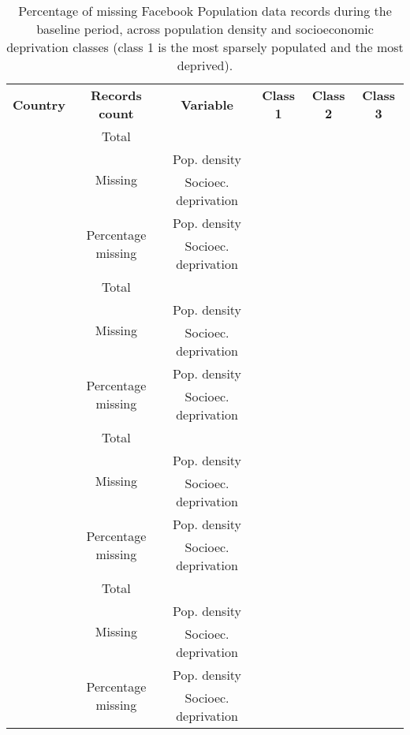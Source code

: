 \documentclass[
  11pt,
]{article}
\begin{document}
\begin{table}[ht]
 \centering 
 \captionsetup{width=\textwidth}
 \caption{Percentage of missing Facebook Population data records during the baseline period, across population density and socioeconomic deprivation classes (class 1 is the most sparsely populated and the most deprived).} 
 
\begin{tabular}{cccccc}
  \multirow{2}{*}{\textbf{Country}} & \multirow{2}{*}{\textbf{Records count}} & \multirow{2}{*}{\textbf{Variable}} & \multirow{2}{*}{\textbf{Class 1}} & \multirow{2}{*}{\textbf{Class 2}} & \multirow{2}{*}{\textbf{Class 3}}\\
  & & & & \\
  \Xhline{1.5pt}
   
  \multirow{5}{*}{ \;\; Argentina \;\; } & \;\;Total\;\; & & & & \\ 
  \cline{2-6}
  & \multirow{2}{*}{Missing} & \;\;Pop. density\;\; & & & \\
  & & \;\;Socioec. deprivation\;\; & & & \\
  \cline{2-6}
  & \multirow{2}{*}{Percentage missing} &  \;\;Pop. density\;\; & & & \\
  & & \;\;Socioec. deprivation\;\; & & & \\
  \Xhline{1.5pt}
  
  \multirow{5}{*}{ \;\; Chile \;\; } & \;\;Total\;\; & & & & \\ 
  \cline{2-6}
  & \multirow{2}{*}{Missing} & \;\;Pop. density\;\; & & & \\
  & & \;\;Socioec. deprivation\;\; & & & \\
  \cline{2-6}
  & \multirow{2}{*}{Percentage missing} &  \;\;Pop. density\;\; & & & \\
  & & \;\;Socioec. deprivation\;\; & & & \\
  \Xhline{1.5pt}
  
  \multirow{5}{*}{ \;\; Colombia \;\; } & \;\;Total\;\; & & & & \\ 
  \cline{2-6}
  & \multirow{2}{*}{Missing} & \;\;Pop. density\;\; & & & \\
  & & \;\;Socioec. deprivation\;\; & & & \\
  \cline{2-6}
  & \multirow{2}{*}{Percentage missing} &  \;\;Pop. density\;\; & & & \\
  & & \;\;Socioec. deprivation\;\; & & & \\
  \Xhline{1.5pt}
  
  \multirow{5}{*}{ \;\; Mexico \;\; } & \;\;Total\;\; & & & & \\ 
  \cline{2-6}
  & \multirow{2}{*}{Missing} & \;\;Pop. density\;\; & & & \\
  & & \;\;Socioec. deprivation\;\; & & & \\
  \cline{2-6}
  & \multirow{2}{*}{Percentage missing} &  \;\;Pop. density\;\; & & & \\
  & & \;\;Socioec. deprivation\;\; & & & \\
  
 \end{tabular}
\vspace{5mm}
\end{table}
\end{document}
